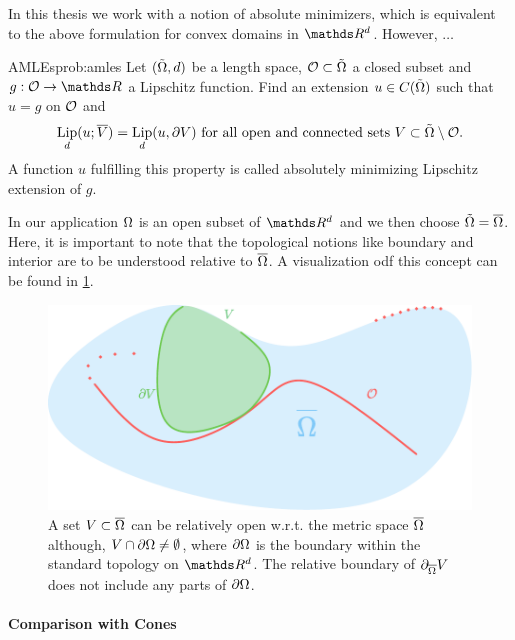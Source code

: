 In this thesis we work with a notion of absolute minimizers, which is equivalent to the above formulation for convex domains in $\R^d$. However, 
$\ldots$
%
\begin{problem}{AMLEs}{prob:amles}
Let $(\tilde{\Omega}, d)$ be a length space, $\mathcal{O}\subset\tilde{\Omega}$ a closed subset and $g:\conset\to\R$ a Lipschitz function. Find an extension $u\in C(\tilde{\Omega})$ such that $u=g$ on $\mathcal{O}$ and
%
\begin{align*}
\operatorname*{Lip}_d(u; \overline{V}) = \operatorname*{Lip}_d(u, \partial V) \text{ for all open and connected sets } V\subset \tilde{\Omega}\setminus \mathcal{O}.
\end{align*}
%
A function $u$ fulfilling this property is called absolutely minimizing Lipschitz extension of $g$.
\end{problem}
%
\begin{remark}{}{}
In our application $\Omega$ is an open subset of $\R^d$ and we then choose $\tilde{\Omega} = \overline{\Omega}$. Here, it is important to note that 
the topological notions like boundary and interior are to be understood relative to $\overline{\Omega}$. A visualization odf this concept can be found in \cref{fig:relb}.
\end{remark}
%
\begin{figure}
\begin{center}
\includegraphics[width=.7\textwidth]{atelier/SSL/relboundary.pdf}
\end{center}
\caption{A set $V\subset\overline{\Omega}$ can be relatively open w.r.t. the metric space $\overline{\Omega}$ although, $V\cap\partial\Omega \neq\emptyset$, where $\partial \Omega$ is the boundary within the standard topology on $\R^d$. The relative boundary of $\partial_{\overline{\Omega}} V$ does not include any parts of $\partial \Omega$.}\label{fig:relb}
\end{figure}
%
%
\paragraph{Comparison with Cones}

